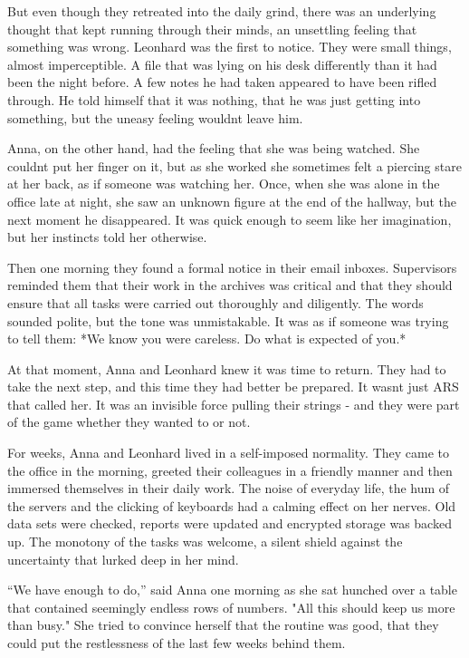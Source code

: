 \documentclass[
]{article}
\begin{document}
But even though they retreated into the daily grind, there was an
underlying thought that kept running through their minds, an unsettling
feeling that something was wrong. Leonhard was the first to notice. They
were small things, almost imperceptible. A file that was lying on his
desk differently than it had been the night before. A few notes he had
taken appeared to have been rifled through. He told himself that it was
nothing, that he was just getting into something, but the uneasy feeling
wouldn\textquotesingle t leave him.

Anna, on the other hand, had the feeling that she was being watched. She
couldn\textquotesingle t put her finger on it, but as she worked she
sometimes felt a piercing stare at her back, as if someone was watching
her. Once, when she was alone in the office late at night, she saw an
unknown figure at the end of the hallway, but the next moment he
disappeared. It was quick enough to seem like her imagination, but her
instincts told her otherwise.

Then one morning they found a formal notice in their email inboxes.
Supervisors reminded them that their work in the archives was critical
and that they should ensure that all tasks were carried out thoroughly
and diligently. The words sounded polite, but the tone was unmistakable.
It was as if someone was trying to tell them: *We know you were
careless. Do what is expected of you.*

At that moment, Anna and Leonhard knew it was time to return. They had
to take the next step, and this time they had better be prepared. It
wasn\textquotesingle t just ARS that called her. It was an invisible
force pulling their strings - and they were part of the game whether
they wanted to or not.

For weeks, Anna and Leonhard lived in a self-imposed normality. They
came to the office in the morning, greeted their colleagues in a
friendly manner and then immersed themselves in their daily work. The
noise of everyday life, the hum of the servers and the clicking of
keyboards had a calming effect on her nerves. Old data sets were
checked, reports were updated and encrypted storage was backed up. The
monotony of the tasks was welcome, a silent shield against the
uncertainty that lurked deep in her mind.

``We have enough to do,'' said Anna one morning as she sat hunched over
a table that contained seemingly endless rows of numbers. "All this
should keep us more than busy." She tried to convince herself that the
routine was good, that they could put the restlessness of the last few
weeks behind them.
\end{document}
